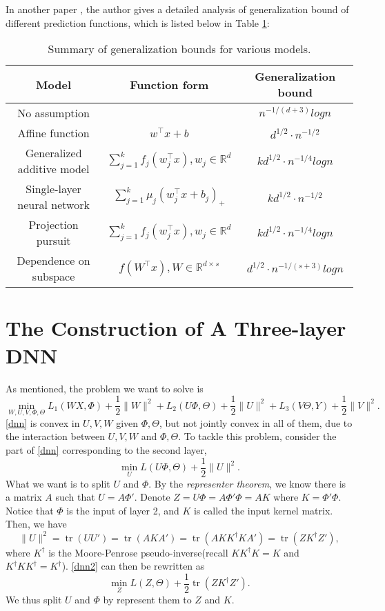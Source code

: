 \documentclass{article}
\DeclareMathOperator{\tr}{tr}
\begin{document}
In another paper \cite{oseledets2009breaking}, the author gives a detailed analysis of generalization bound of different prediction functions, which is listed below in Table \ref{table:bounds}:
\begin{table}[htb]
	\begin{tabular}{|c|c|c|}
		\hline
		Model & Function form & Generalization bound\\
		\hline
		No assumption & & $n^{-1/(d+3)}log n$\\
		\hline
		Affine function & $w^\top x + b$ & $d^{1/2}\cdot n^{-1/2}$\\
		\hline
		Generalized additive model & $\sum_{j=1}^{k}f_{j}(w_{j}^\top x),w_{j}\in \mathbb{R}^{d}$ & $k d^{1/2}\cdot n^{-1/4}log n$\\
		\hline
		Single-layer neural network & $\sum_{j=1}^{k} \mu_{j} (w_{j}^\top x + b_{j})_{+}$ & $k d^{1/2} \cdot n^{-1/2}$\\
		\hline
		Projection pursuit & $\sum_{j=1}^{k} f_{j}(w_{j}^\top x), w_{j} \in \mathbb{R}^{d}$ & $k d^{1/2}\cdot n^{-1/4}log n$\\
		\hline
		Dependence on subspace & $f(W^\top x), W \in \mathbb{R}^{d \times s}$ & $d^{1/2}\cdot n^{-1/(s+3)}log n$\\
		\hline
	\end{tabular}
	\caption{Summary of generalization bounds for various models.}
	\label{table:bounds}
\end{table}
\section{The Construction of A Three-layer DNN}
As mentioned, the problem we want to solve is 
\begin{equation}\label{dnn}
\min_{W,U,V,\Phi,\Theta}L_1(WX,\Phi)+\frac{1}{2}\|W\|^2+L_2(U\Phi,\Theta)+\frac{1}{2}\|U\|^2+L_3(V\Theta,Y)+\frac{1}{2}\|V\|^2.
\end{equation}
\eqref{dnn} is convex in $U,V,W$ given $\Phi,\Theta$, but not jointly convex in all of them, due to the interaction between $U,V,W$ and $\Phi,\Theta$. To tackle this problem, \cite{aslan2013convex} consider the part of \eqref{dnn} corresponding to the second layer,
\begin{equation}\label{dnn2}
	\min_U L(U\Phi,\Theta)+\frac{1}{2}\|U\|^2.
\end{equation}
What we want is to split $U$ and $\Phi$. By the \emph{representer theorem}, we know there is a matrix $A$ such that $U=A\Phi'$. Denote $Z=U\Phi=A\Phi'\Phi=AK$ where $K=\Phi'\Phi$. Notice that $\Phi$ is the input of layer 2, and $K$ is called the input kernel matrix. Then, we have 
\[\|U\|^2=\tr(UU')=\tr(AKA')=\tr(AKK^\dagger KA')=\tr(ZK^\dagger Z'),\]
where $K^\dagger$ is the Moore-Penrose pseudo-inverse(recall $KK^\dagger K=K$ and $K^\dagger KK^\dagger=K^\dagger$). \eqref{dnn2} can then be rewritten as
\begin{equation}\label{dnn3}
	\min_Z L(Z,\Theta)+\frac{1}{2}\tr(ZK^\dagger Z').
\end{equation}
We thus split $U$ and $\Phi$ by represent them to $Z$ and $K$.
\end{document}
